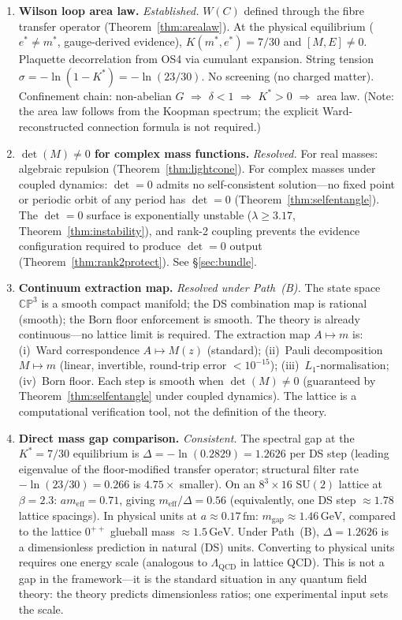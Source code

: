 \documentclass[11pt,a4paper]{article}
\theoremstyle{definition}
\theoremstyle{remark}
\newcommand{\CP}{\mathbb{CP}}
\newcommand{\SU}{\mathrm{SU}}
\begin{document}
\begin{enumerate}[nosep]
\item \textbf{Wilson loop area law.} \emph{Established.} $W(C)$ defined through the fibre transfer operator (Theorem~\ref{thm:arealaw}). At the physical equilibrium ($e^*\neq m^*$, gauge-derived evidence), $K(m^*,e^*)=7/30$ and $[M,E]\neq 0$. Plaquette decorrelation from OS4 via cumulant expansion. String tension $\sigma=-\ln(1-K^*)=-\ln(23/30)$. No screening (no charged matter). Confinement chain: non-abelian $G$ $\Rightarrow$ $\delta<1$ $\Rightarrow$ $K^*>0$ $\Rightarrow$ area law. (Note: the area law follows from the Koopman spectrum; the explicit Ward-reconstructed connection formula is not required.)
\item \textbf{$\det(M)\neq 0$ for complex mass functions.} \emph{Resolved.} For real masses: algebraic repulsion (Theorem~\ref{thm:lightcone}). For complex masses under coupled dynamics: $\det=0$ admits no self-consistent solution---no fixed point or periodic orbit of any period has $\det=0$ (Theorem~\ref{thm:selfentangle}). The $\det=0$ surface is exponentially unstable ($\lambda\geq 3.17$, Theorem~\ref{thm:instability}), and rank-2 coupling prevents the evidence configuration required to produce $\det=0$ output (Theorem~\ref{thm:rank2protect}). See \S\ref{sec:bundle}.
\item \textbf{Continuum extraction map.} \emph{Resolved under Path~(B).} The state space $\CP^3$ is a smooth compact manifold; the DS combination map is rational (smooth); the Born floor enforcement is smooth. The theory is already continuous---no lattice limit is required. The extraction map $A\mapsto m$ is: (i)~Ward correspondence $A\mapsto M(z)$ (standard); (ii)~Pauli decomposition $M\mapsto m$ (linear, invertible, round-trip error $<10^{-15}$); (iii)~$L_1$-normalisation; (iv)~Born floor. Each step is smooth when $\det(M)\neq 0$ (guaranteed by Theorem~\ref{thm:selfentangle} under coupled dynamics). The lattice is a computational verification tool, not the definition of the theory.
\item \textbf{Direct mass gap comparison.} \emph{Consistent.} The spectral gap at the $K^*=7/30$ equilibrium is $\Delta=-\ln(0.2829)=1.2626$ per DS step (leading eigenvalue of the floor-modified transfer operator; structural filter rate $-\ln(23/30)=0.266$ is $4.75\times$ smaller). On an $8^3\times 16$ $\SU(2)$ lattice at $\beta=2.3$: $am_{\mathrm{eff}}=0.71$, giving $m_{\mathrm{eff}}/\Delta=0.56$ (equivalently, one DS step $\approx 1.78$ lattice spacings). In physical units at $a\approx 0.17\,\mathrm{fm}$: $m_{\mathrm{gap}}\approx 1.46\,\mathrm{GeV}$, compared to the lattice $0^{++}$ glueball mass $\approx 1.5\,\mathrm{GeV}$. Under Path~(B), $\Delta=1.2626$ is a dimensionless prediction in natural (DS) units. Converting to physical units requires one energy scale (analogous to $\Lambda_{\mathrm{QCD}}$ in lattice QCD). This is not a gap in the framework---it is the standard situation in any quantum field theory: the theory predicts dimensionless ratios; one experimental input sets the scale.

\end{enumerate}
\end{document}
